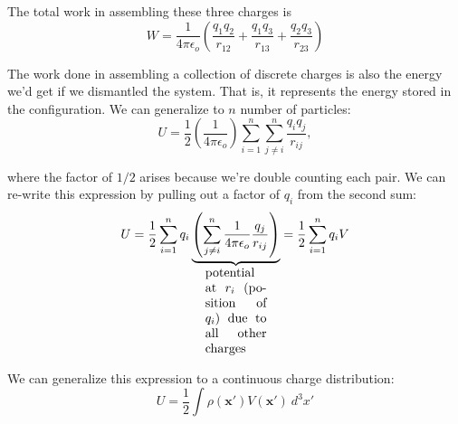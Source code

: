 \documentclass{article}
\numberwithin{equation}{section}
\begin{document}
\begin{figure}[H]
\centering
{}
\label{fig:3:b}
\end{figure}

The total work in assembling these three charges is
\begin{equation*}
    W = \frac{1}{4\pi\epsilon_o} \left( \frac{q_1 q_2}{r_{12}} + \frac{q_1 q_3}{r_{13}} + \frac{q_2 q_3}{r_{23}} \right)
\end{equation*}

The work done in assembling a collection of discrete charges is also the energy we'd get if we dismantled the system. That is, it represents the energy stored in the configuration. We can generalize to $n$ number of particles:
\begin{equation*}
    U = \frac{1}{2} \left(\frac{1}{4\pi\epsilon_o}\right) \sum\limits_{i = 1}^{n} \sum\limits_{j \neq i}^{n} \frac{q_i q_j}{r_{ij}},
\end{equation*}

where the factor of $1/2$ arises because we're double counting each pair. We can re-write this expression by pulling out a factor of $q_i$ from the second sum:
\begin{equation*}
    U = \frac{1}{2} \sum\limits_{i = 1}^{n} q_i \underbrace{\left( \sum\limits_{j \neq i}^{n} \frac{1}{4\pi\epsilon_o} \frac{q_j}{r_{ij}} \right)}_{\parbox[c]{0.14\textwidth}{potential at $r_i$ (position of $q_i$) due to all other charges}} = \frac{1}{2} \sum\limits_{i = 1}^{n} q_i V
\end{equation*}

We can generalize this expression to a continuous charge distribution:
\begin{equation}
    \boxed{U = \frac{1}{2} \int \rho(\bm{x'}) V(\bm{x'})\ d^3x'} \label{eq:3:u} \tag{1}
\end{equation}
\end{document}
